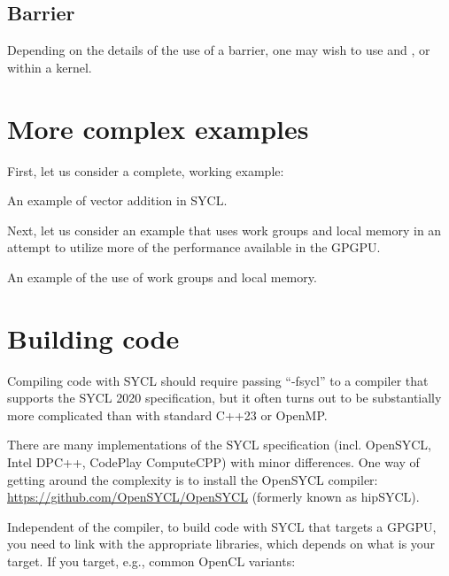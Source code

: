 \subsection{Barrier}

Depending on the details of the use of a barrier, one may wish to use  and , or  within a kernel.


\section{More complex examples}

First, let us consider a complete, working example:

\raggedbottom
\begin{codebox}[]{\href{https://godbolt.org/z/cPqE9PM6T}{\ExternalLink}}
\footnotesize An example of vector addition in SYCL.
\tcblower
{}
\end{codebox}

Next, let us consider an example that uses work groups and local memory in an attempt to utilize more of the performance available in the GPGPU. 

\raggedbottom
\begin{codebox}[]{\href{https://godbolt.org/z/4cvGY1sE9}{\ExternalLink}}
\footnotesize An example of the use of work groups and local memory.
\tcblower
{}
\end{codebox}
         
\section{Building code}

Compiling code with SYCL should require passing ``-fsycl'' to a compiler that supports the SYCL 2020 specification, 
but it often turns out to be substantially more complicated than with standard C++23 or OpenMP.

There are many implementations of the SYCL specification (incl. OpenSYCL, Intel DPC++, CodePlay ComputeCPP)
with minor differences. 
One way of getting around the complexity is to install the OpenSYCL compiler:
\url{https://github.com/OpenSYCL/OpenSYCL} (formerly known as hipSYCL).  

Independent of the compiler, to build code with SYCL that targets a GPGPU, you need to link with the appropriate libraries, which depends on what is your target. 
If you target, e.g., common OpenCL variants: 


